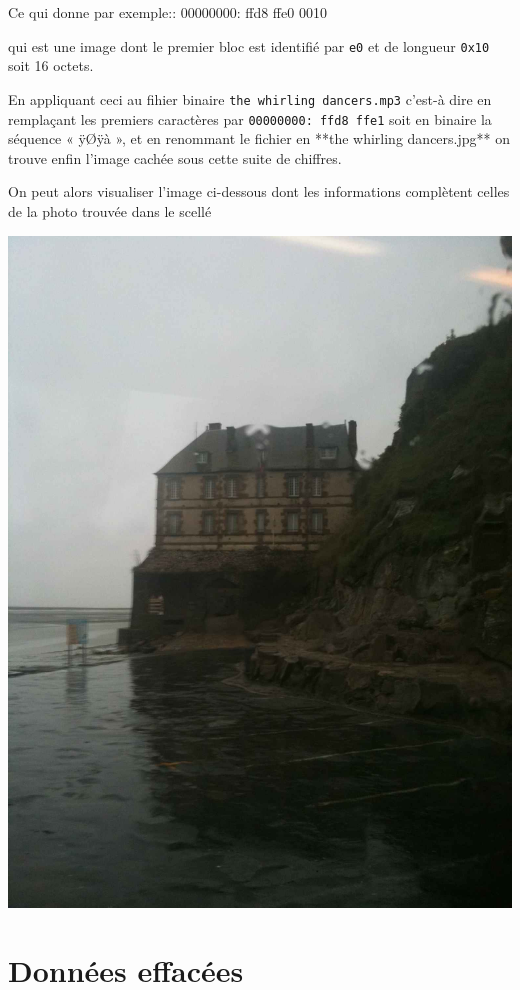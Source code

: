 \documentclass[a4paper,11pt]{article}
\begin{document}
Ce qui donne par exemple:: 
    00000000: ffd8 ffe0 0010

    qui est une image dont le premier bloc est identifié par {\tt e0} et de longueur {\tt 0x10} soit
16 octets.

En appliquant ceci au fihier binaire {\tt the whirling dancers.mp3}
c'est-à dire en remplaçant les premiers caractères par {\tt 00000000: ffd8 ffe1} soit en binaire
la séquence « ÿØÿà », et en renommant le fichier en **the whirling dancers.jpg** on trouve
enfin l'image cachée sous cette suite de chiffres.

On peut alors visualiser l'image ci-dessous dont les informations complètent celles de la
photo trouvée dans le scellé
 
\includegraphics[width=\textwidth]{thewhirlingdancers.jpg}

\section{Données effacées}
\end{document}
